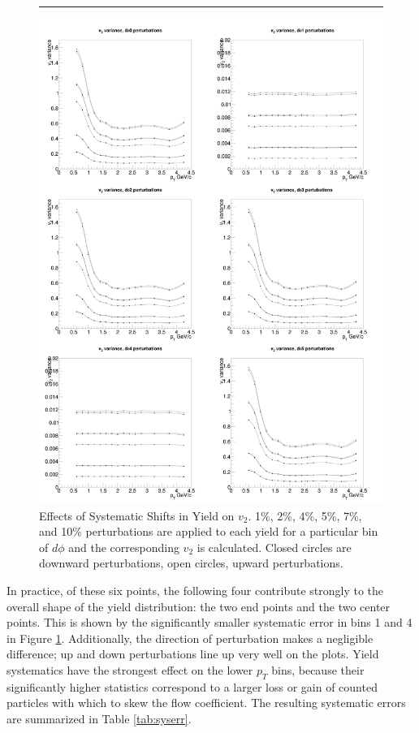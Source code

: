 \begin{figure}[p]
\vspace*{-1in}
\captionsetup{width=1.2\linewidth}
    \caption[Effects of Systematic Shifts in Yield on $v_2$.]{Effects of Systematic Shifts in Yield on $v_2$. 1\%, 2\%, 4\%, 5\%, 7\%, and 10\% perturbations are applied to each yield for a particular bin of $d\phi$ and the corresponding $v_2$ is calculated. Closed circles are downward perturbations, open circles, upward perturbations.}
    \rule{35em}{0.5pt}
    \centerline{\includegraphics[width=1\textwidth]{evtQA/plusminusstudy.jpg}}
    \label{fig:wiggleupdown}
\end{figure}

In practice, of these six points, the following four contribute strongly to the overall shape of the yield distribution: the two end points and the two center points. This is shown by the significantly smaller systematic error in bins 1 and 4 in Figure \ref{fig:wiggleupdown}. Additionally, the direction of perturbation makes a negligible difference; up and down perturbations line up very well on the plots. Yield systematics have the strongest effect on the lower $p_T$ bins, because their significantly higher statistics correspond to a larger loss or gain of counted particles with which to skew the flow coefficient. The resulting systematic errors are summarized in Table \ref{tab:syserr}.


